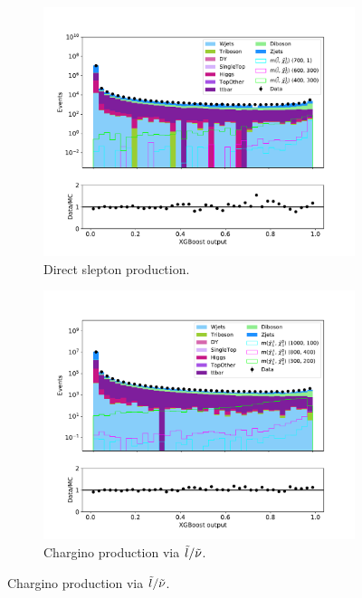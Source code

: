 \begin{figure}[H]
    \centering
    \begin{subfigure}[t!]{0.49\textwidth}
        \includegraphics[width = \textwidth]{Figures/Stacked/stackedplot_BDT_Low_level_slepslep.pdf}
        \caption{Direct slepton production.}
        \label{fig:SlepslepNNLow}
    \end{subfigure}
    \begin{subfigure}[t!]{0.49\textwidth}
        \includegraphics[width = \textwidth]{Figures/Stacked/stackedplot_BDT_Low_level_slepsnu.pdf}
        \caption{Chargino production via $\Tilde{l}/\Tilde{\nu}$.}

\end{subfigure}
\end{figure}
